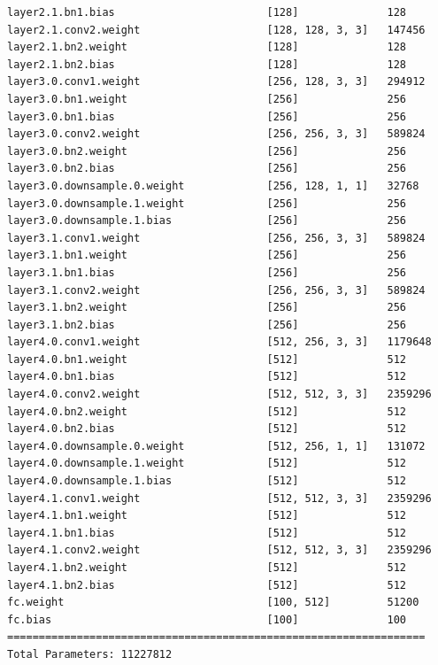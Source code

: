 \documentclass[notitlepage,cs4size,punct,oneside]{ctexrep}
\numberwithin{equation}{chapter}
\theoremstyle{mystyle}
\begin{document}
\begin{appendices}
{\begin{lstlisting}[style=output]
layer2.1.bn1.bias                        [128]              128
layer2.1.conv2.weight                    [128, 128, 3, 3]   147456
layer2.1.bn2.weight                      [128]              128
layer2.1.bn2.bias                        [128]              128
layer3.0.conv1.weight                    [256, 128, 3, 3]   294912
layer3.0.bn1.weight                      [256]              256
layer3.0.bn1.bias                        [256]              256
layer3.0.conv2.weight                    [256, 256, 3, 3]   589824
layer3.0.bn2.weight                      [256]              256
layer3.0.bn2.bias                        [256]              256
layer3.0.downsample.0.weight             [256, 128, 1, 1]   32768
layer3.0.downsample.1.weight             [256]              256
layer3.0.downsample.1.bias               [256]              256
layer3.1.conv1.weight                    [256, 256, 3, 3]   589824
layer3.1.bn1.weight                      [256]              256
layer3.1.bn1.bias                        [256]              256
layer3.1.conv2.weight                    [256, 256, 3, 3]   589824
layer3.1.bn2.weight                      [256]              256
layer3.1.bn2.bias                        [256]              256
layer4.0.conv1.weight                    [512, 256, 3, 3]   1179648
layer4.0.bn1.weight                      [512]              512
layer4.0.bn1.bias                        [512]              512
layer4.0.conv2.weight                    [512, 512, 3, 3]   2359296
layer4.0.bn2.weight                      [512]              512
layer4.0.bn2.bias                        [512]              512
layer4.0.downsample.0.weight             [512, 256, 1, 1]   131072
layer4.0.downsample.1.weight             [512]              512
layer4.0.downsample.1.bias               [512]              512
layer4.1.conv1.weight                    [512, 512, 3, 3]   2359296
layer4.1.bn1.weight                      [512]              512
layer4.1.bn1.bias                        [512]              512
layer4.1.conv2.weight                    [512, 512, 3, 3]   2359296
layer4.1.bn2.weight                      [512]              512
layer4.1.bn2.bias                        [512]              512
fc.weight                                [100, 512]         51200
fc.bias                                  [100]              100
==================================================================
Total Parameters: 11227812


\end{lstlisting}}
\end{appendices}
\end{document}
